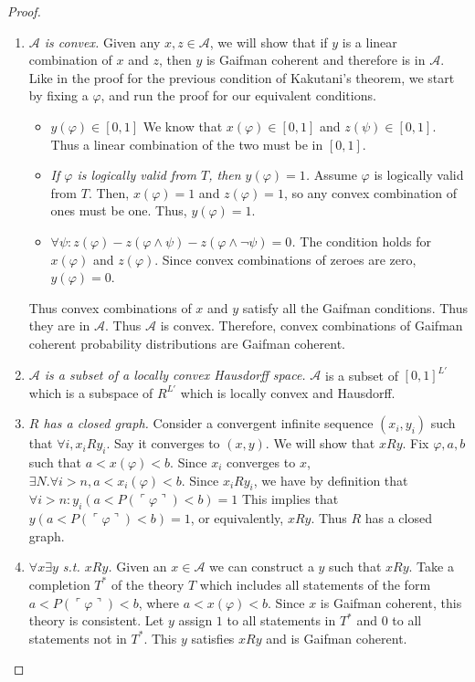 \documentclass[12pt]{article}
\theoremstyle{plain}
\theoremstyle{definition}
\theoremstyle{remark}
\begin{document}
\begin{proof}
\begin{enumerate}
\item \emph{$\mathcal{A}$ is convex.}
Given any $x,z\in\mathcal{A}$, we will show that if $y$ is a linear combination of $x$ and $z$, then $y$ is Gaifman coherent and therefore is in $\mathcal{A}$.
Like in the proof for the previous condition of Kakutani's theorem, we start by fixing a $\varphi$, and run the proof for our equivalent conditions.
\begin{itemize}
\item \emph{$y(\varphi) \in [0, 1]$}
We know that $x(\varphi) \in [0,1]$ and $z(\psi) \in [0,1]$.
Thus a linear combination of the two must be in $[0,1]$.
\item \emph{If $\varphi$ is logically valid from $T$, then $y(\varphi)=1$.}
Assume $\varphi$ is logically valid from $T$.
Then, $x(\varphi)=1$ and $z(\varphi)=1$, so any convex combination of ones must be one.
Thus, $y(\varphi) = 1$.
\item \emph{$\forall \psi: z(\varphi) -z(\varphi\wedge\psi)-z(\varphi\wedge\neg\psi)=0$.}
The condition holds for $x(\varphi)$ and $z(\varphi)$.
Since convex combinations of zeroes are zero, $y(\varphi)=0$.
\end{itemize}
Thus convex combinations of $x$ and $y$ satisfy all the Gaifman conditions. Thus they are in $\mathcal{A}$. Thus $\mathcal{A}$ is convex.
Therefore, convex combinations of Gaifman coherent probability distributions are Gaifman coherent.

\item \emph{$\mathcal{A}$ is a subset of a locally convex Hausdorff space.}
$\mathcal{A}$ is a subset of $[0, 1]^{L'}$ which is a subspace of $R^{L'}$ which is locally convex and Hausdorff.

\item \emph{$R$ has a closed graph.}
Consider a convergent infinite sequence $(x_i,y_i)$ such that $\forall i, x_iRy_i$. Say it converges to $(x,y)$.
We will show that $xRy$.
Fix $\varphi, a, b$ such that $a < x(\varphi) < b$.
Since $x_i$ converges to $x$, $\exists N. \forall i > n, a < x_i(\varphi) < b.$
Since $x_iRy_i$, we have by definition that $\forall i>n: y_i(a < P(\ulcorner \varphi \urcorner) < b) = 1$
This implies that $y(a < P(\ulcorner \varphi \urcorner) < b) = 1$, or equivalently, $xRy$.
Thus $R$ has a closed graph.

\item \emph{$\forall x \exists y$ s.t. $xRy$.}
Given an $x\in\mathcal{A}$ we can construct a $y$ such that $xRy$.
Take a completion $T^*$ of the theory $T$ which includes all statements of the form $a < P(\ulcorner \varphi \urcorner) < b$, where $a < x(\varphi) < b$.
Since $x$ is Gaifman coherent, this theory is consistent.
Let $y$ assign $1$ to all statements in $T^*$ and $0$ to all statements not in $T^*$.
This $y$ satisfies $xRy$ and is Gaifman coherent.


\end{enumerate}
\end{proof}
\end{document}

